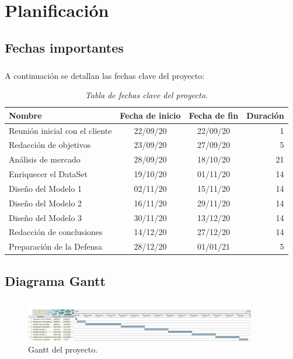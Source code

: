 \chapter{Planificación}
\label{chapter:planificación}


\section{Fechas importantes}

\paragraph{}
A continuación se detallan las fechas clave del proyecto:

\begin{table}[h!]
	\centering{}
	\begin{tabular}{ l | c | c | r }
		\hline
		Nombre & Fecha de inicio & Fecha de fin & Duración \\
		\hline
		\hline
		Reunión inicial con el cliente & 22/09/20 & 22/09/20 & 1  \\
		\hline
		Redacción de objetivos & 23/09/20 & 27/09/20 & 5  \\
		\hline
		Análisis de mercado & 28/09/20 & 18/10/20 & 21  \\
		\hline
		Enriquecer el DataSet & 19/10/20 & 01/11/20 & 14 \\
		\hline
		Diseño del Modelo 1 & 02/11/20 & 15/11/20 & 14  \\
		\hline
		Diseño del Modelo 2 & 16/11/20 & 29/11/20 & 14  \\
		\hline
		Diseño del Modelo 3 & 30/11/20 & 13/12/20 & 14  \\
		\hline
		Redacción de conclusiones & 14/12/20 & 27/12/20 & 14  \\
		\hline
		Preparación de la Defensa & 28/12/20 & 01/01/21 & 5  \\
		\hline
	\end{tabular}
	\caption{\textit{Tabla de fechas clave del proyecto}.}
	\label{table:gant_tabla}
\end{table}

\section{Diagrama Gantt}

\paragraph{}
\begin{figure}[h!]
	\centering
	\includegraphics[width=0.9\textwidth]{figs/gant.png}
	\caption{Gantt del proyecto.}
	\label{fig:gant}
\end{figure}